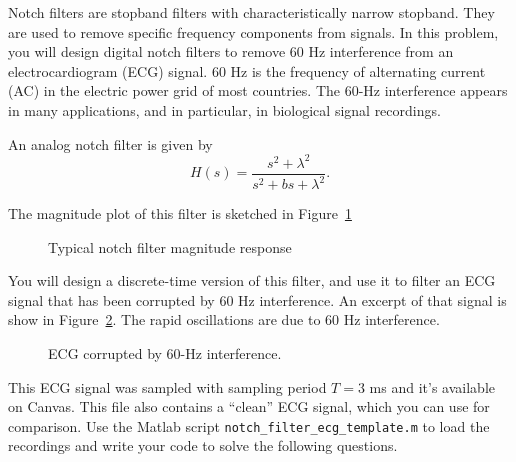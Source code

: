 \documentclass[12pt]{report}
\begin{document}
\newpage
{}

Notch filters are stopband filters with characteristically narrow stopband. They are used to remove specific frequency components from signals. In this problem, you will design digital notch filters to remove 60 Hz interference from an electrocardiogram (ECG) signal. 60 Hz is the frequency of alternating current (AC) in the electric power grid of most countries. The 60-Hz interference appears in many applications, and in particular, in biological signal recordings.

An analog notch filter is given by
\begin{equation} \label{eq:analog-notch-filter}
H(s) = \frac{s^2 + \lambda^2}{s^2 + bs + \lambda^2}.
\end{equation}

The magnitude plot of this filter is sketched in Figure~\ref{fig:notch_filter_mag}

\begin{figure}[h!]
	\centering
	\resizebox{0.45\textwidth}{!}{}
	\caption{Typical notch filter magnitude response}
	\label{fig:notch_filter_mag}
\end{figure}

You will design a discrete-time version of this filter, and use it to filter an ECG signal that has been corrupted by 60 Hz interference. An excerpt of that signal is show in Figure~\ref{fig:sample_ecg}. The rapid oscillations are due to 60 Hz interference.

\FloatBarrier
\begin{figure}
	\centering
	\resizebox{0.9\textwidth}{!}{}
	\caption{ECG corrupted by 60-Hz interference.}
	\label{fig:sample_ecg}
\end{figure}
\FloatBarrier

This ECG signal was sampled with sampling period $T = 3$ ms and it's available on Canvas. This file also contains a ``clean'' ECG signal, which you can use for comparison. Use the Matlab script \texttt{notch\_filter\_ecg\_template.m} to load the recordings and write your code to solve the following questions.
\end{document}
